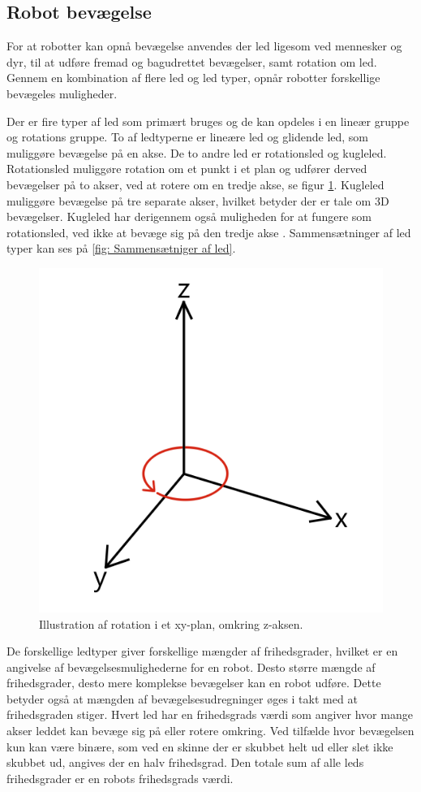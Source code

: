 \subsection{Robot bevægelse}
For at robotter kan opnå bevægelse anvendes der led ligesom ved mennesker og dyr, til at udføre fremad og bagudrettet bevægelser, samt rotation om led. Gennem en kombination af flere led og led typer, opnår robotter forskellige bevægeles muligheder. 

Der er fire typer af led som primært bruges og de kan opdeles i en lineær gruppe og rotations gruppe. To af ledtyperne er lineære led og glidende led, som muliggøre bevægelse på en akse. De to andre led er rotationsled og kugleled. Rotationsled muliggøre rotation om et punkt i et plan og udfører derved bevægelser på to akser, ved at rotere om en tredje akse, se figur \ref{fig:rotation i planet}. Kugleled muliggøre bevægelse på tre separate akser, hvilket betyder der er tale om 3D bevægelser. Kugleled har derigennem også muligheden for at fungere som rotationsled, ved ikke at bevæge sig på den tredje akse \parencite{Niku2020IntroductionApplications}. Sammensætninger af led typer kan ses på \ref{fig: Sammensætniger af led}.
\begin{figure} [H]
    \centering
    \includegraphics[width=0.4\linewidth]{Sections/2 Problemanalyse/Media/Rotation i planet.png}
    \caption{Illustration af rotation i et xy-plan, omkring z-aksen.}
    \label{fig:rotation i planet}
\end{figure}
De forskellige ledtyper giver forskellige mængder af frihedsgrader, hvilket er en angivelse af bevægelsesmulighederne for en robot. Desto større mængde af frihedsgrader, desto mere komplekse bevægelser kan en robot udføre. Dette betyder også at mængden af bevægelsesudregninger øges i takt med at frihedsgraden stiger. Hvert led har en frihedsgrads værdi som angiver hvor mange akser leddet kan bevæge sig på eller rotere omkring. Ved tilfælde hvor bevægelsen kun kan være binære, som ved en skinne der er skubbet helt ud eller slet ikke skubbet ud, angives der en halv frihedsgrad. Den totale sum af alle leds frihedsgrader er en robots frihedsgrads værdi. 

